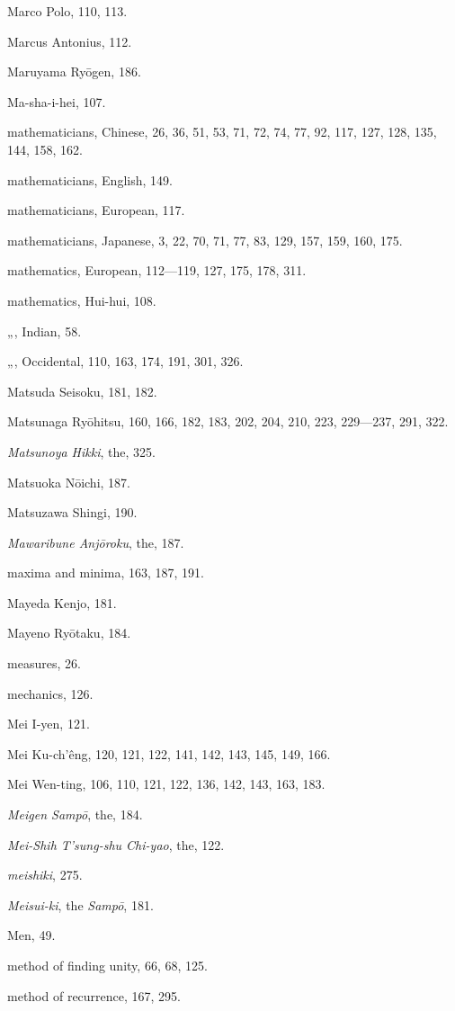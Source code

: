 \documentclass[11pt]{article}
\begin{document}
Marco Polo, 110, 113.\par
Marcus Antonius, 112.\par
Maruyama Ryōgen, 186.\par
Ma-sha-i-hei, 107.\par
mathematicians, Chinese, 26, 36, 51, 53, 71, 72, 74, 77, 92, 117, 127, 128, 135, 144, 158, 162.\par
mathematicians, English, 149.\par
mathematicians, European, 117.\par
mathematicians, Japanese, 3, 22, 70, 71, 77, 83, 129, 157, 159, 160, 175.\par
mathematics, European, 112—119, 127, 175, 178, 311.\par
mathematics, Hui-hui, 108.\par
\quad „\qquad, Indian, 58.\par
\quad „\qquad, Occidental, 110, 163, 174, 191, 301, 326.\par
Matsuda Seisoku, 181, 182.\par
Matsunaga Ryōhitsu, 160, 166, 182, 183, 202, 204, 210, 223, 229—237, 291, 322.\par
\emph{Matsunoya Hikki}, the, 325.\par
Matsuoka Nōichi, 187.\par
Matsuzawa Shingi, 190.\par
\emph{Mawaribune Anjōroku}, the, 187.\par
maxima and minima, 163, 187, 191.\par
Mayeda Kenjo, 181.\par
Mayeno Ryōtaku, 184.\par
measures, 26.\par
mechanics, 126.\par
Mei I-yen, 121.\par
Mei Ku-ch'êng, 120, 121, 122, 141, 142, 143, 145, 149, 166.\par
Mei Wen-ting, 106, 110, 121, 122, 136, 142, 143, 163, 183.\par
\emph{Meigen Sampō}, the, 184.\par
\emph{Mei-Shih T'sung-shu Chi-yao}, the, 122.\par
\emph{meishiki}, 275.\par
\emph{Meisui-ki}, the \emph{Sampō}, 181.\par
Men, 49.\par
method of finding unity, 66, 68, 125.\par
method of recurrence, 167, 295.\par
\end{document}
